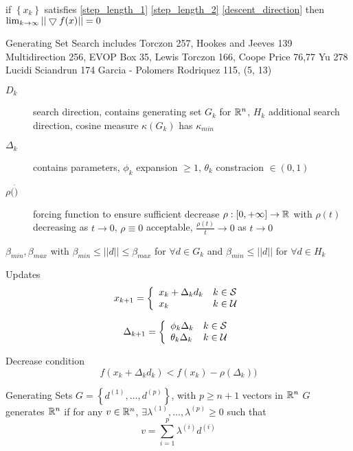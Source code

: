 if $\left\{x_k\right\}$ satisfies \ref{step_length_1} \ref{step_length_2} \ref{descent_direction}
then $\lim_{k\rightarrow \infty } || \bigtriangledown f(x) || = 0$

Generating Set Search
includes Torczon 257, Hookes and Jeeves 139 Multidirection 256, EVOP Box 35, Lewis Torczon 166, Coope Price 76,77 Yu 278 Lucidi Sciandrun 174 Garcia - Polomers Rodriquez 115,     (5, 13)

\begin{description}
\item[$D_k$] search direction, contains generating set $G_k$ for $\mathbb{R}^{n}$, $H_k$ additional search direction, 
cosine measure $\kappa (G_k)$ has $\kappa_{min}$
\item[$\Delta_k$] contains parameters, $\phi_k$ expansion $\ge 1$, $\theta_k $ constracion $\in (0,1)$
\item[$\rho ( \dot )$] forcing function to ensure sufficient decrease $\rho : \left[ 0 , + \infty \right] \rightarrow \mathbb{R}^{}$ with $\rho(t)$ decreasing as $t \rightarrow 0$, $\rho \equiv 0$ acceptable, $\frac{\rho (t)}{t} \rightarrow 0 $ as $t\rightarrow 0$ 
\end{description}

$\beta_{min}, \beta_{max}$
with $\beta_{min} \le ||d|| \le \beta_{max} $ for $\forall d \in G_k$ and $\beta_{min} \le || d ||$ for $\forall d \in H_k$


Updates
\begin{equation}
x_{k+1} = \left\{  \begin{array}{l l}
						x_k + \Delta_k d_k  	&	k \in \mathcal{S} \\
						x_k					&	k \in \mathcal{U} 
					\end{array}
			\right.
\end{equation}


\begin{equation}
\Delta_{k+1} = \left\{  \begin{array}{l l}
						\phi_k \Delta_k  		&	k \in \mathcal{S} \\
						\theta_k \Delta_k	&	k \in \mathcal{U} 
					\end{array}
			\right.
\end{equation}

Decrease condition
\begin{equation}
f(x_k  + \Delta_k d_k ) < f(x_k) - \rho ( \Delta_k))
\end{equation}

Generating Sets
$G = \left\{ d^{(1)} , ... , d^{(p)} \right\}$, with $p \ge n+1$ vectors in $\mathbb{R}^{n}$
$G$ generates $\mathbb{R}^{n}$ if for any $v\in \mathbb{R}^{n}$, $\exists \lambda^{(1)}, ..., \lambda^{(p)} \ge 0$ such that
\begin{equation}
v = \sum_{i=1}^p \lambda^{(i)} d^{(i)}
\end{equation}

